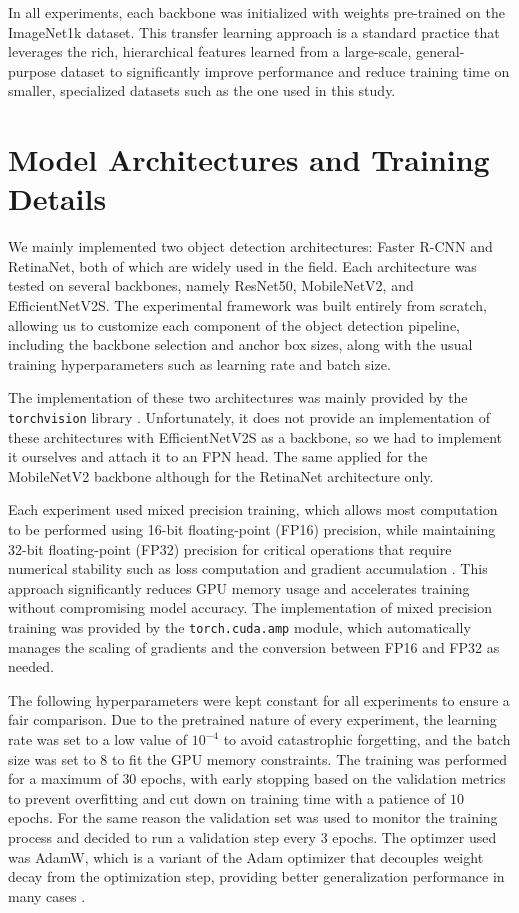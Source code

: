 In all experiments, each backbone was initialized with weights pre-trained on the ImageNet1k dataset. This transfer learning approach is a standard practice that leverages the rich, hierarchical features learned from a large-scale, general-purpose dataset to significantly improve performance and reduce training time on smaller, specialized datasets such as the one used in this study. 

\section{Model Architectures and Training Details}
We mainly implemented two object detection architectures: Faster R-CNN and RetinaNet, both of which are widely used in the field. Each architecture was tested on several backbones, namely ResNet50, MobileNetV2, and EfficientNetV2S.
The experimental framework was built entirely from scratch, allowing us to customize each component of the object detection pipeline, including the backbone selection and anchor box sizes, along with the usual training hyperparameters such as learning rate and batch size.

The implementation of these two architectures was mainly provided by the \texttt{torchvision} library \cite{torchvision2016} . Unfortunately, it does not provide an implementation of these architectures with EfficientNetV2S as a backbone, so we had to implement it ourselves and attach it to an FPN head. The same applied for the MobileNetV2 backbone although for the RetinaNet architecture only. 

Each experiment used mixed precision training, which allows most computation to be performed using 16-bit floating-point (FP16) precision, while maintaining 32-bit floating-point (FP32) precision for critical operations that require numerical stability such as loss computation and gradient accumulation \cite{micikevicius2018mixedprecisiontraining}.
This approach significantly reduces GPU memory usage and accelerates training without compromising model accuracy. The implementation of mixed precision training was provided by the \texttt{torch.cuda.amp} module, which automatically manages the scaling of gradients and the conversion between FP16 and FP32 as needed. 

The following hyperparameters were kept constant for all experiments to ensure a fair comparison.
Due to the pretrained nature of every experiment, the learning rate was set to a low value of $10^{-4}$ to avoid catastrophic forgetting, and the batch size was set to $8$ to fit the GPU memory constraints. The training was performed for a maximum of $30$ epochs, with early stopping based on the validation metrics to prevent overfitting and cut down on training time with a patience of $10$ epochs. For the same reason the validation set was used to monitor the training process and decided to run a validation step every $3$ epochs.
The optimzer used was AdamW, which is a variant of the Adam optimizer that decouples weight decay from the optimization step, providing better generalization performance in many cases \cite{loshchilov2019decoupled, kingma2017adam}.

